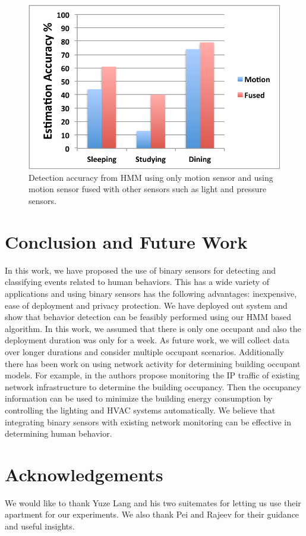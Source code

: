 \documentclass[10pt, conference, compsocconf]{IEEEtran}
\begin{document}
\begin{figure}
\begin{center}
\includegraphics[width=0.7\columnwidth]{plot2-crop}
\end{center}
\caption{Detection accuracy from HMM using only motion sensor and using motion sensor fused with other sensors such as light and pressure sensors.}
\label{fig:plot2-crop}
\end{figure}


\section{Conclusion and Future Work}
In this work, we have proposed the use of binary sensors for detecting and classifying events related to human behaviors. This has a wide variety of applications and using binary sensors has the following advantages: inexpensive, ease of deployment and privacy protection. We have deployed out system and show that behavior detection can be feasibly performed using our HMM based algorithm. In this work, we assumed that there is only one occupant and also the deployment duration was only for a week. As future work, we will collect data over longer durations and consider multiple occupant scenarios.
Additionally there has been work on using network activity for determining building occupant models. For example, in \cite{wifi} the authors propose monitoring the IP traffic of existing network infrastructure to determine the building occupancy. Then the occupancy information can be used to minimize the building energy consumption by controlling the lighting and HVAC systems automatically. We believe that integrating binary sensors with existing network monitoring can be effective in determining human behavior.

\section{Acknowledgements}
We would like to thank Yuze Lang and his two suitemates for letting us use their apartment for our experiments. We also thank Pei and Rajeev for their guidance and useful insights.
\end{document}
